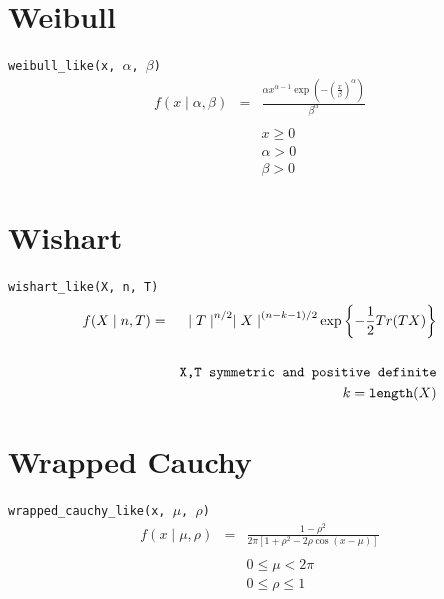 \documentclass[]{book}
\begin{document}
\section*{Weibull}
\verb=weibull_like(x, =$\alpha$\verb=, =$\beta$\verb=)=
\begin{eqnarray*}
f(x \mid \alpha, \beta) &=& \frac{\alpha x^{\alpha - 1} \exp(-(\frac{x}{\beta})^{\alpha})}{\beta^\alpha} \\
\\
&& x \ge 0 \\
&& \alpha > 0 \\
&& \beta > 0
\end{eqnarray*}

\section*{Wishart}
\verb=wishart_like(X, n, T)=
\begin{eqnarray*}
f(X \mid n, T) &=& {\mid T \mid}^{n/2}{\mid X \mid}^{(n-k-1)/2} \exp\left\{ -\frac{1}{2} Tr(TX) \right\}\\
\\
&& \verb=X,T symmetric and positive definite= \\
&& k = \verb=length=(X)
\end{eqnarray*}

\section*{Wrapped Cauchy}
\verb=wrapped_cauchy_like(x, =$\mu$\verb=, =$\rho$\verb=)=
\begin{eqnarray*}
f(x \mid \mu, \rho) &=& \frac{1-\rho^2}{2\pi [1 + \rho^2 - 2\rho\cos(x-\mu)]} \\
\\
&& 0 \le \mu < 2\pi \\
&& 0 \le \rho \le 1
\end{eqnarray*}
\end{document}
